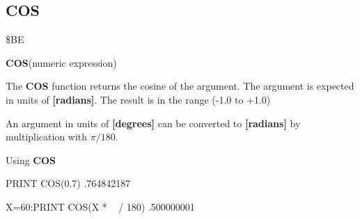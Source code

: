 \subsection{COS}
\begin{description}[leftmargin=3cm,style=nextline]
\item [Token:] \$BE
\item [Format:] {\bf COS}(numeric expression)
\item [Usage:] The {\bf COS} function returns the cosine of the
               argument.
               The argument is expected in units of {\bf [radians]}.
               The result is in the range (-1.0 to +1.0)

\item [Remarks:] An argument in units of {\bf [degrees]}
                 can be converted to {\bf [radians]}
               by multiplication with $\pi/180$.
\item [Example:] Using {\bf COS}
\begin{screenoutput}
  PRINT COS(0.7)
   .764842187

  X=60:PRINT COS(X * ~ / 180)
   .500000001
\end{screenoutput}
\end{description}


\newpage
